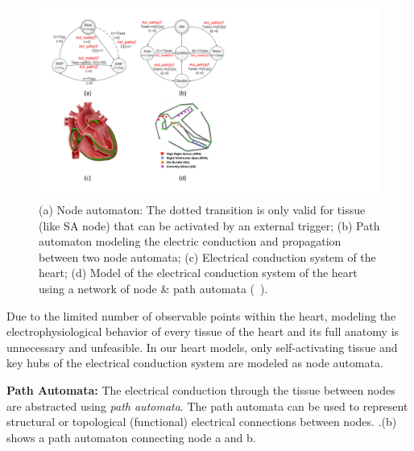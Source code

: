 \begin{figure}[!t]
		\includegraphics[width=\textwidth]{figs/automata.pdf}

\caption{\small (a) Node automaton: The dotted transition is only valid for tissue (like SA node) that can be activated by an external trigger; (b) Path automaton modeling the electric conduction and propagation between two node automata; (c) Electrical conduction system of the heart; (d) Model of the electrical conduction system of the heart using a network of node \& path automata (~\cite{VHM_proc}).}\label{fig:automata}
\end{figure} 

Due to the limited number of observable points within the heart, modeling the electrophysiological behavior of every tissue of the heart and its full anatomy is unnecessary and unfeasible. In our heart models, only self-activating tissue and key hubs of the electrical conduction system are modeled as node automata. 

\textbf{Path Automata:} The electrical conduction through the tissue between nodes are abstracted using \emph{path automata}. The path automata can be used to represent structural or topological (functional) electrical connections between nodes. .(b) shows a path automaton connecting node a and b.

